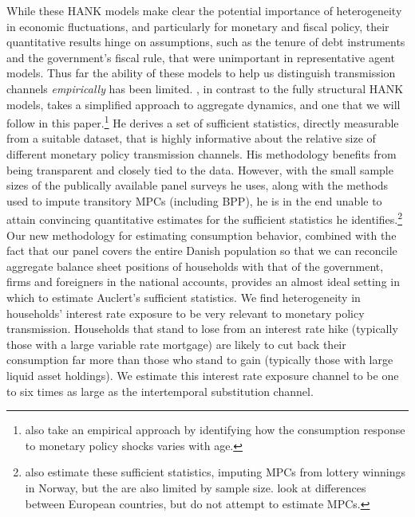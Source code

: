 \documentclass[titlepage]{\econtex}\newcommand{\texname}{ConsumptionHeterogeneity}
\begin{document}
While these HANK models make clear the potential importance of heterogeneity in economic fluctuations, and particularly for monetary and fiscal policy, their quantitative results hinge on assumptions, such as the tenure of debt instruments and the government's fiscal rule, that were unimportant in representative agent models. Thus far the ability of these models to help us distinguish transmission channels \textit{empirically} has been limited. \cite{auclert_monetary_2017}, in contrast to the fully structural HANK models, takes a simplified approach to aggregate dynamics, and one that we will follow in this paper.\footnote{\cite{wong_population_2016} also take an empirical approach by identifying how the consumption response to monetary policy shocks varies with age.} He derives a set of sufficient statistics, directly measurable from a suitable dataset, that is highly informative about the  relative size of different monetary policy transmission channels. His methodology benefits from being transparent and closely tied to the data. However, with the small sample sizes of the publically available panel surveys he uses, along with the methods used to impute transitory MPCs (including BPP), he is in the end unable to attain convincing quantitative estimates for the sufficient statistics he identifies.\footnote{\cite{fagereng_mpc_2016} also estimate these sufficient statistics, imputing MPCs from lottery winnings in Norway, but the are also limited by sample size. \cite{ampudia_monetary_2018} look at differences between European countries, but do not attempt to estimate MPCs.} Our new methodology for estimating consumption behavior, combined with the fact that our panel covers the entire Danish population so that we can reconcile aggregate balance sheet positions of households with that of the government, firms and foreigners in the national accounts, provides an almost ideal setting in which to estimate Auclert's sufficient statistics. We find heterogeneity in households' interest rate exposure to be very relevant to monetary policy transmission. Households that stand to lose from an interest rate hike (typically those with a large variable rate mortgage) are likely to cut back their consumption far more than those who stand to gain (typically those with large liquid asset holdings). We estimate this interest rate exposure channel to be one to six times as large as the intertemporal substitution channel.
\end{document}
